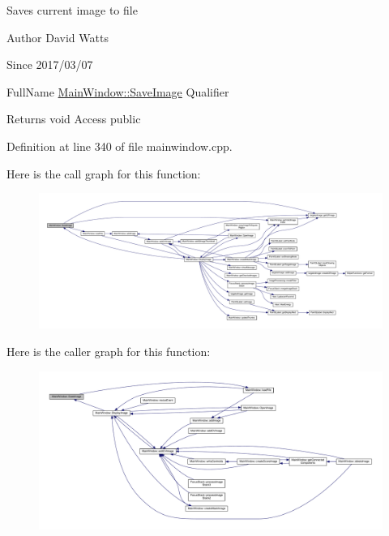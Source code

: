 Saves current image to file

\begin{DoxyAuthor}{Author}
David Watts 
\end{DoxyAuthor}
\begin{DoxySince}{Since}
2017/03/07
\end{DoxySince}
Full\+Name \hyperlink{class_main_window_aa816921e6ce14f558ada5c73c8a5ef20}{Main\+Window\+::\+Save\+Image} Qualifier \begin{DoxyReturn}{Returns}
void Access public 
\end{DoxyReturn}


Definition at line 340 of file mainwindow.\+cpp.

Here is the call graph for this function\+:
\nopagebreak
\begin{figure}[H]
\begin{center}
\leavevmode
\includegraphics[width=350pt]{class_main_window_aa816921e6ce14f558ada5c73c8a5ef20_cgraph}
\end{center}
\end{figure}
Here is the caller graph for this function\+:
\nopagebreak
\begin{figure}[H]
\begin{center}
\leavevmode
\includegraphics[width=350pt]{class_main_window_aa816921e6ce14f558ada5c73c8a5ef20_icgraph}
\end{center}
\end{figure}
\mbox{\label{class_main_window_a5e130e8122dbab96f931a7ecc41086d3}} 
